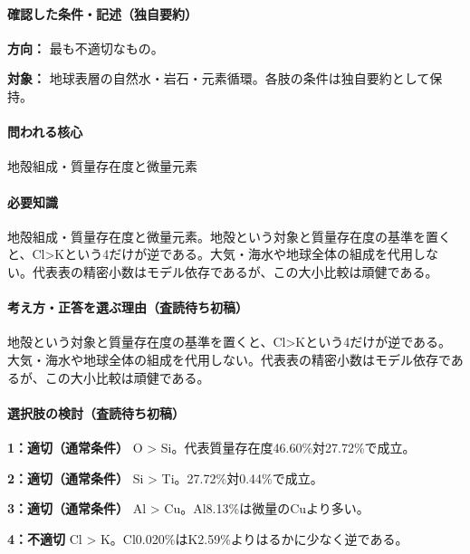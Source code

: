 \paragraph{確認した条件・記述（独自要約）}\mbox{}\par

\noindent\textbf{方向：} 最も不適切なもの。\par

\noindent\textbf{対象：} 地球表層の自然水・岩石・元素循環。各肢の条件は独自要約として保持。\par

\paragraph{問われる核心} 地殻組成・質量存在度と微量元素

\paragraph{必要知識} 地殻組成・質量存在度と微量元素。地殻という対象と質量存在度の基準を置くと、Cl>Kという4だけが逆である。大気・海水や地球全体の組成を代用しない。代表表の精密小数はモデル依存であるが、この大小比較は頑健である。

\paragraph{考え方・正答を選ぶ理由（査読待ち初稿）} 地殻という対象と質量存在度の基準を置くと、Cl>Kという4だけが逆である。大気・海水や地球全体の組成を代用しない。代表表の精密小数はモデル依存であるが、この大小比較は頑健である。

\paragraph{選択肢の検討（査読待ち初稿）}\mbox{}\par

\noindent\textbf{1：適切（通常条件）} O > Si。代表質量存在度46.60\%対27.72\%で成立。\par

\noindent\textbf{2：適切（通常条件）} Si > Ti。27.72\%対0.44\%で成立。\par

\noindent\textbf{3：適切（通常条件）} Al > Cu。Al8.13\%は微量のCuより多い。\par

\noindent\textbf{4：不適切} Cl > K。Cl0.020\%はK2.59\%よりはるかに少なく逆である。\par

